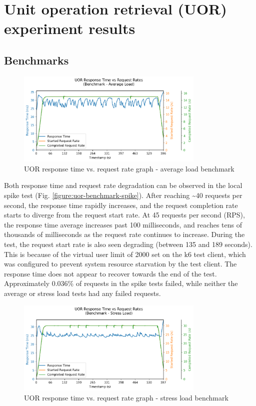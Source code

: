\section{Unit operation retrieval (UOR) experiment results}

\subsection{Benchmarks}

\begin{figure}[H]
    
    \centering
    \includegraphics[width=0.8\textwidth]{figures/uor-benchmark-average.png}
    \caption{UOR response time vs. request rate graph - average load benchmark}
    \label{figure:uor-benchmark-average}
\end{figure}

Both response time and request rate degradation can be observed in the local spike test (Fig. \ref{figure:uor-benchmark-spike}). After reaching \textasciitilde40 requests per second, the response time rapidly increases, and the request completion rate starts to diverge from the request start rate. At 45 requests per second (RPS), the response time average increases past 100 milliseconds, and reaches tens of thousands of milliseconds as the request rate continues to increase. During the test, the request start rate is also seen degrading (between 135 and 189 seconds). This is because of the virtual user limit of 2000 set on the k6 test client, which was configured to prevent system resource starvation by the test client. The response time does not appear to recover towards the end of the test. Approximately 0.036\% of requests in the spike tests failed, while neither the average or stress load tests had any failed requests.

\begin{figure}[H]
    \centering
    \includegraphics[width=0.8\textwidth]{figures/uor-benchmark-stress.png}
    \caption{UOR response time vs. request rate graph - stress load benchmark}
    \label{figure:uor-benchmark-stress}
\end{figure}

